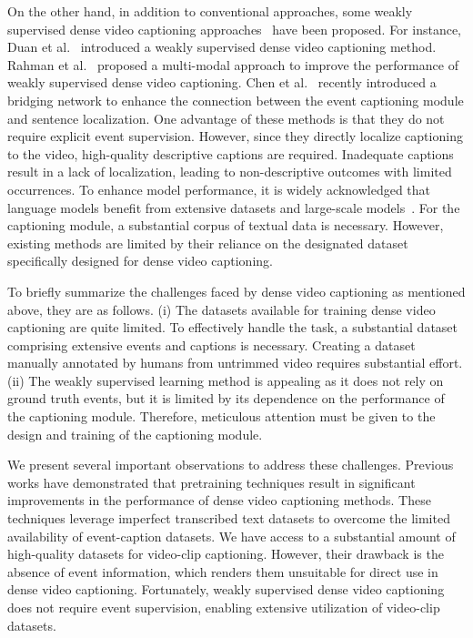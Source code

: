 On the other hand, in addition to conventional approaches, some weakly supervised dense video captioning approaches~\cite{Duan2018-qf,Rahman2019-rp,Chen2021-sv} have been proposed.
For instance, Duan et al.~\cite{Duan2018-qf} introduced a weakly supervised dense video captioning method.
Rahman et al.~\cite{Rahman2019-rp} proposed a multi-modal approach to improve the performance of weakly supervised dense video captioning.
Chen et al.~\cite{Chen2021-sv} recently introduced a bridging network to enhance the connection between the event captioning module and sentence localization.
One advantage of these methods is that they do not require explicit event supervision.
However, since they directly localize captioning to the video, high-quality descriptive captions are required.
Inadequate captions result in a lack of localization, leading to non-descriptive outcomes with limited occurrences.
To enhance model performance, it is widely acknowledged that language models benefit from extensive datasets and large-scale models~\cite{Borgeaud2021-dx}.
For the captioning module, a substantial corpus of textual data is necessary.
However, existing methods are limited by their reliance on the designated dataset specifically designed for dense video captioning.

To briefly summarize the challenges faced by dense video captioning as mentioned above, they are as follows.
(i) The datasets available for training dense video captioning are quite limited.
To effectively handle the task, a substantial dataset comprising extensive events and captions is necessary. 
Creating a dataset manually annotated by humans from untrimmed video requires substantial effort.
(ii) The weakly supervised learning method is appealing as it does not rely on ground truth events, but it is limited by its dependence on the performance of the captioning module.
Therefore, meticulous attention must be given to the design and training of the captioning module.

We present several important observations to address these challenges. Previous works have demonstrated that pretraining techniques result in significant improvements in the performance of dense video captioning methods. 
These techniques leverage imperfect transcribed text datasets to overcome the limited availability of event-caption datasets. We have access to a substantial amount of high-quality datasets for video-clip captioning. 
However, their drawback is the absence of event information, which renders them unsuitable for direct use in dense video captioning.
Fortunately, weakly supervised dense video captioning does not require event supervision, enabling extensive utilization of video-clip datasets.


